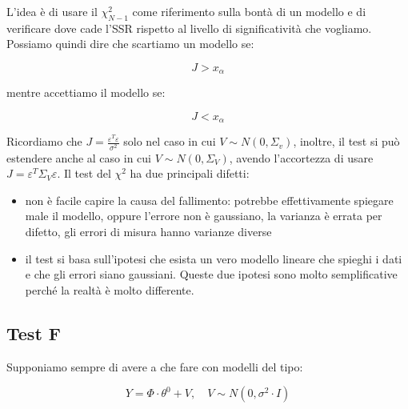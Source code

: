 L'idea è di usare il $\chi_{N-1}^2$ come riferimento sulla bontà di un modello e di verificare dove cade l'SSR rispetto al livello di significatività che vogliamo. Possiamo quindi dire che scartiamo un modello se:

    \[ J>x_\alpha \]

mentre accettiamo il modello se:

    \[ J<x_\alpha \]

Ricordiamo che $J=\frac{\varepsilon^T\varepsilon}{\sigma^2}$ solo nel caso in cui $V\sim N(0,\Sigma_v)$, inoltre, il test si può estendere anche al caso in cui $V\sim N(0,\Sigma_V)$, avendo l'accortezza di usare $J=\varepsilon^T\Sigma_V\varepsilon$. \newline
Il test del $\chi^2$ ha due principali difetti:
\begin{itemize}
  \item non è facile capire la causa del fallimento: potrebbe effettivamente spiegare male il modello, oppure l'errore non è gaussiano, la varianza è errata per difetto, gli errori di misura hanno varianze diverse
  \item il test si basa sull'ipotesi che esista un vero modello lineare che spieghi i dati e che gli errori siano gaussiani. Queste due ipotesi sono molto semplificative perché la realtà è molto differente.
\end{itemize}
\subsection{Test F}
Supponiamo sempre di avere a che fare con modelli del tipo:

    \[ Y=\Phi\cdot\theta^0+V,  \quad  V\sim N(0,\sigma^2\cdot I) \]

